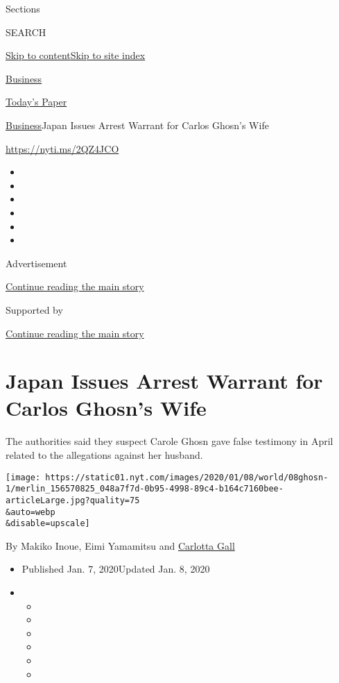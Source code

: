 Sections

SEARCH

\protect\hyperlink{site-content}{Skip to
content}\protect\hyperlink{site-index}{Skip to site index}

\href{https://www.nytimes.com/section/business}{Business}

\href{https://myaccount.nytimes.com/auth/login?response_type=cookie\&client_id=vi}{}

\href{https://www.nytimes.com/section/todayspaper}{Today's Paper}

\href{/section/business}{Business}\textbar{}Japan Issues Arrest Warrant
for Carlos Ghosn's Wife

\url{https://nyti.ms/2QZ4JCO}

\begin{itemize}
\item
\item
\item
\item
\item
\item
\end{itemize}

Advertisement

\protect\hyperlink{after-top}{Continue reading the main story}

Supported by

\protect\hyperlink{after-sponsor}{Continue reading the main story}

\hypertarget{japan-issues-arrest-warrant-for-carlos-ghosns-wife}{%
\section{Japan Issues Arrest Warrant for Carlos Ghosn's
Wife}\label{japan-issues-arrest-warrant-for-carlos-ghosns-wife}}

The authorities said they suspect Carole Ghosn gave false testimony in
April related to the allegations against her husband.

\texttt{[image: https://static01.nyt.com/images/2020/01/08/world/08ghosn-1/merlin\_156570825\_048a7f7d-0b95-4998-89c4-b164c7160bee-articleLarge.jpg?quality=75\\\&auto=webp\\\&disable=upscale]}

By Makiko Inoue, Eimi Yamamitsu and
\href{https://www.nytimes.com/by/carlotta-gall}{Carlotta Gall}

\begin{itemize}
\item
  Published Jan. 7, 2020Updated Jan. 8, 2020
\item
  \begin{itemize}
  \item
  \item
  \item
  \item
  \item
  \item
  \end{itemize}
\end{itemize}

